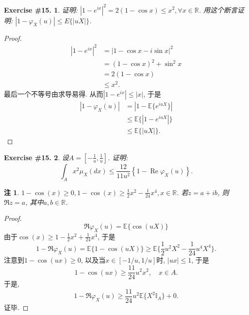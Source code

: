 \documentclass[UTF8, a4paper]{article}
\newtheorem{exercise}{Exercise \#15.}
\newtheorem*{remark}{注}
\begin{document}
\begin{framed}
\begin{exercise}
证明: \(\left|1-e^{i x}\right|^2=2(1-\cos x) \leq x^2, \forall x \in \mathbb{R}\).
用这个断言证明: $\left|1-\varphi_X(u)\right| \leq E\{|u X|\}$.
\end{exercise}
\end{framed}

\begin{proof}
\begin{align*}
    \left|1-e^{i x}\right|^2 &= \left|1-\cos x - i\sin x\right|^2 \\
    &= (1-\cos x)^2 + \sin^2 x \\
    &= 2(1-\cos x) \\
    &\leq x^2.
\end{align*}
最后一个不等号由求导易得.
从而\(|1-e^{i x}| \leq |x|\), 于是
\begin{align*}
    \left|1-\varphi_X(u)\right| &= 
    \left|1-\mathbb{E}\{e^{i u X}\}\right| \\
    &\leq \mathbb{E}\{\left|1-e^{i u X}\right| \}\\
    &\leq \mathbb{E}\{|u X|\}.
\end{align*}
\end{proof}


\begin{framed}
\begin{exercise}
设\(A = \left[-\frac{1}{u}, \frac{1}{u}\right]\). 证明:
$$
\int_A x^2 \mu_X(d x) \leq \frac{12}{11 u^2}\left\{1-\operatorname{Re} \varphi_X(u)\right\} .
$$
\end{exercise} 
\end{framed}

\begin{remark}
\(1-\cos(x) \geq 0, 1-\cos(x) \geq \frac{1}{2}x^2 - \frac{1}{24}x^4, x\in \mathbb{R}\).
若\(z = a+ib\), 则\(\Re z = a\), 其中\(a, b \in \mathbb{R}\).
\end{remark}


\begin{proof}
$$
\Re \varphi_X(u) = \mathbb{E}\{\cos(uX)\}
$$
由于\(\cos(x) \geq 1 - \frac{1}{2}x^2 + \frac{1}{24}x^4\), 于是
$$
1- \Re \varphi_X(u) = \mathbb{E}\{1 - \cos(uX)\} \geq \mathbb{E}\{\frac{1}{2}u^2 X^2 - \frac{1}{24}u^4 X^4\}.
$$
注意到\(1-\cos(ux) \geq 0\), 以及当\(x \in [-1/u, 1/u]\)时, \(|ux| \leq 1\), 于是
$$
1 - \cos (ux) \geq \frac{11}{24} u^2 x^2, \quad x \in A.
$$
于是, 
$$
1 - \Re \varphi_X(u) \geq \frac{11}{24} u^2 \mathbb{E}\{X^2 \mathbb{I}_A\} + 0.
$$
证毕.
\end{proof}
\end{document}
